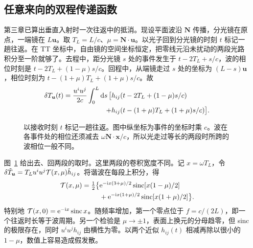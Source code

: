 \subsection{任意来向的双程传递函数}
第三章已算出垂直入射时一次往返中的抵消。现设平面波沿 $\bm N$ 传播，分光镜在原点，一端镜在 $L\bm u$。取 $T_L=L/c$、$\mu=\bm N\cdot\bm u$。以光子回到分光镜的时刻 $t$ 标记一趟往返。在 TT 坐标中，自由镜的空间坐标恒定，把零线元沿未扰动的两段光路积分至一阶就够了。去程中，距分光镜 $s$ 处的事件发生于 $t-2T_L+s/c$，波的相位时刻是 $t-2T_L+(1-\mu)s/c$。回程中，从端镜走过 $s$ 处的坐标为 $(L-s)\bm u$，相位时刻为 $t-(1+\mu)T_L+(1+\mu)s/c$。故
\begin{align*}
 \delta T_{\bm u}(t)=\frac{u^iu^j}{2c}\int_0^L\dd s\,\big[
 &h_{ij}(t-2T_L+(1-\mu)s/c)\\
 +{}&h_{ij}(t-(1+\mu)T_L+(1+\mu)s/c)\big].
\end{align*}
\begin{figure}[htbp]
 \centering
 \caption{以接收时刻 $t$ 标记一趟往返。图中纵坐标为事件的坐标时乘 $c$。波在各事件处的相位还须减去 $\omega\bm N\cdot\bm x/c$，所以光走过等长的两段时所跨的波相位一般不同。}
 \label{fig:gw-b-path}
\end{figure}

图~\ref{fig:gw-b-path} 给出去、回两段的取时。这里两段的卷积宽度不同。记 $x=\omega T_L$，令 $\delta\tilde T_{\bm u}=T_Lu^iu^j{\cal T}(x,\mu)\tilde h_{ij}$。将谐波在每段上积分，得
\begin{align}
 {\cal T}(x,\mu)=\tfrac12\big\{&
 \mathrm{e}^{-\mathrm{i} x(3+\mu)/2}\operatorname{sinc}[x(1-\mu)/2]\nonumber\\
 &+\mathrm{e}^{-\mathrm{i} x(1+\mu)/2}\operatorname{sinc}[x(1+\mu)/2]\big\}.
 \label{eq:gw-b-arm}
\end{align}
特别地 ${\cal T}(x,0)=\mathrm{e}^{-\mathrm{i} x}\operatorname{sinc}x$。随频率增加，第一个零点位于 $f=c/(2L)$，即一个往返时长等于波周期。另一个检验是 $\mu\to\pm1$，表面上换元的分母趋零，但 sinc 的极限存在，同时 $u^iu^jh_{ij}$ 由横性为零。以两个近似 $h_{ij}(t)$ 相减再除以很小的 $1-\mu$，数值上容易造成假发散。

